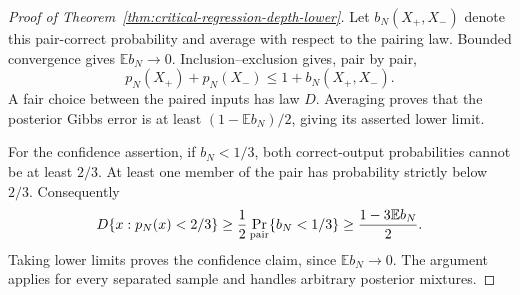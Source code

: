 \begin{proof}[Proof of Theorem~\ref{thm:critical-regression-depth-lower}]
Let $b_N(X_+,X_-)$ denote this pair-correct probability and average
with respect to the pairing law. Bounded convergence gives
$\mathbb E b_N\to0$. Inclusion--exclusion gives, pair by pair,
\[
 p_N(X_+)+p_N(X_-)\le1+b_N(X_+,X_-).
\]
A fair choice between the paired inputs has law $D$. Averaging proves
that the posterior Gibbs error is at least
$(1-\mathbb E b_N)/2$, giving its asserted lower limit.

For the confidence assertion, if $b_N<1/3$, both correct-output
probabilities cannot be at least $2/3$. At least one member of the
pair has probability strictly below $2/3$. Consequently
\[
 D\{x:p_N(x)<2/3\}\ge\frac12\Pr_{\rm pair}\{b_N<1/3\}
 \ge\frac{1-3\mathbb E b_N}{2}.
\]
Taking lower limits proves the confidence claim, since $\mathbb E b_N\to0$.
The argument applies
for every separated sample and handles arbitrary posterior mixtures.
\end{proof}
